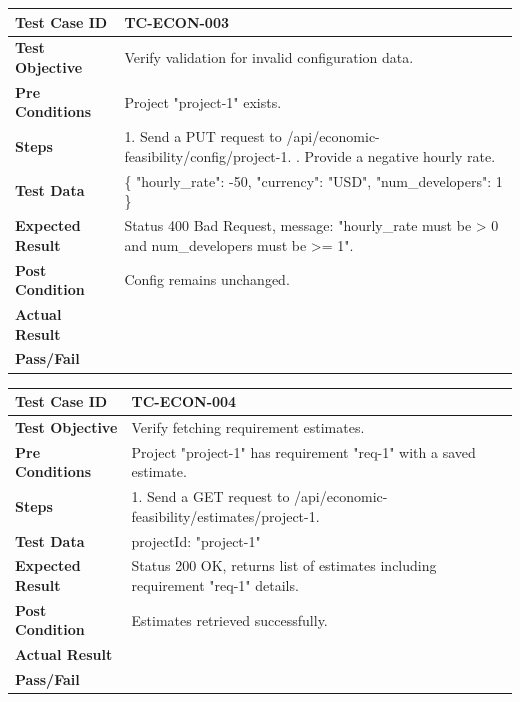 \begin{longtable}{|p{}|p{}|}
\hline
\textbf{Test Case ID} & TC-ECON-003 \\ \hline
\textbf{Test Objective} & Verify validation for invalid configuration data. \\ \hline
\textbf{Pre Conditions} & Project "project-1" exists. \\ \hline
\textbf{Steps} & 
1. Send a PUT request to /api/economic-feasibility/config/project-1. \newline
2. Provide a negative hourly rate. \\ \hline
\textbf{Test Data} & \{ "hourly\_rate": -50, "currency": "USD", "num\_developers": 1 \} \\ \hline
\textbf{Expected Result} & Status 400 Bad Request, message: "hourly\_rate must be > 0 and num\_developers must be >= 1". \\ \hline
\textbf{Post Condition} & Config remains unchanged. \\ \hline
\textbf{Actual Result} &  \\ \hline
\textbf{Pass/Fail} &  \\ \hline
\end{longtable}

\begin{longtable}{|p{}|p{}|}
\hline
\textbf{Test Case ID} & TC-ECON-004 \\ \hline
\textbf{Test Objective} & Verify fetching requirement estimates. \\ \hline
\textbf{Pre Conditions} & Project "project-1" has requirement "req-1" with a saved estimate. \\ \hline
\textbf{Steps} & 
1. Send a GET request to /api/economic-feasibility/estimates/project-1. \\ \hline
\textbf{Test Data} & projectId: "project-1" \\ \hline
\textbf{Expected Result} & Status 200 OK, returns list of estimates including requirement "req-1" details. \\ \hline
\textbf{Post Condition} & Estimates retrieved successfully. \\ \hline
\textbf{Actual Result} &  \\ \hline
\textbf{Pass/Fail} &  \\ \hline
\end{longtable}

